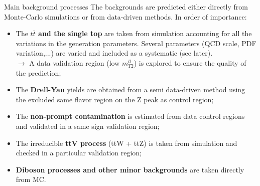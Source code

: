 \documentclass[8pt]{beamer}
\begin{document}
\begin{frame}{Main background processes}
\justifying
The backgrounds are predicted either directly from \alert{Monte-Carlo simulations or from data-driven methods}. In order of importance:

\begin{itemize}
\justifying
\item The \textbf{$t \bar t$ and the single top} are taken from simulation accounting for all the variations in the generation parameters. Several parameters (QCD scale, PDF variation,...) are varied and included as a systematic (see later). \\
$\rightarrow$ A data validation region (low $m_{T2}^{ll}$) is explored to ensure the quality of the prediction;
\item The \textbf{Drell-Yan} yields are obtained from a semi data-driven method using the excluded same flavor region on the Z peak as control region;
\item The \textbf{non-prompt contamination} is estimated from data control regions and validated in a same sign validation region;
\item The irreducible \textbf{ttV process} (ttW + ttZ) is taken from simulation and checked in a particular validation region;
\item \textbf{Diboson processes and other minor backgrounds} are taken directly from MC.
\end{itemize}
\end{frame}
\end{document}
